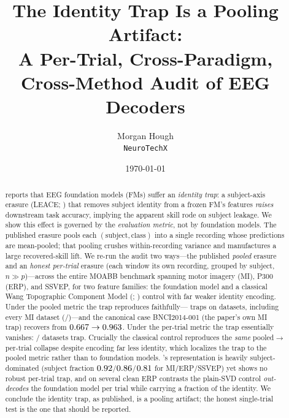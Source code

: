 \documentclass[11pt]{article}
\title{The Identity Trap Is a Pooling Artifact:\\
A Per-Trial, Cross-Paradigm, Cross-Method Audit of EEG Decoders}
\author{Morgan Hough\\\texttt{NeuroTechX}}
\date{\today}
\begin{document}
\sloppy  %
\maketitle

\begin{abstract}
\fmscope{} \citep{fmscope} reports that EEG foundation models (FMs) suffer an
\emph{identity trap}: a subject-axis erasure (LEACE; \citealp{belrose2023leace}) that removes
subject identity from a frozen FM's features \emph{raises} downstream task accuracy, implying
the apparent skill rode on subject leakage. We show this effect is governed by the
\emph{evaluation metric}, not by foundation models. The published erasure pools each
$(\text{subject},\text{class})$ into a single recording whose predictions are mean-pooled; that
pooling crushes within-recording variance and manufactures a large recovered-skill lift. We
re-run the audit two ways---the published \emph{pooled} erasure and an \emph{honest per-trial}
erasure (each window its own recording, grouped by subject, $n\gg p$)---across the entire MOABB
benchmark spanning motor imagery (MI), P300 (ERP), and SSVEP, for two feature families: the
\reve{} foundation model and a classical Wang Topographic Component Model (\tcm{};
\citealp{wang2000tcm}) control with far weaker identity encoding. Under the pooled metric the
trap reproduces faithfully---\reve{} traps on \fmPoolTrapTotal{} datasets, including every MI
dataset (\fmmiPoolTrap{}/\fmmiPoolN{})---and the canonical case BNCI2014-001 (the
\fmscope{} paper's own MI trap) recovers from $0.667{}\rightarrow0.963{}$. Under
the per-trial metric the trap essentially vanishes: \fmPtTrapTotal{}/\fmPtNTotal{} \reve{} datasets
trap. Crucially the classical \tcm{} control reproduces the \emph{same} pooled$\to$per-trial
collapse despite encoding far less identity, which localizes the trap to the pooled metric rather
than to foundation models. \reve{}'s representation is heavily subject-dominated (subject fraction
$0.92{}$/$0.86{}$/$0.81{}$ for MI/ERP/SSVEP) yet shows no
robust per-trial trap, and on several clean ERP contrasts the plain-SVD control \emph{out-decodes}
the foundation model per trial while carrying a fraction of the identity. We conclude the identity
trap, as published, is a pooling artifact; the honest single-trial test is the one that should be
reported.
\end{abstract}
\end{document}

